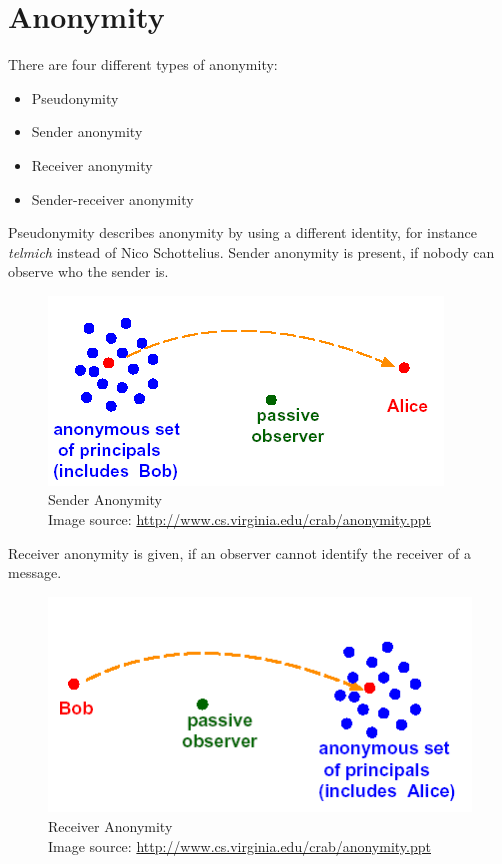 \section{Anonymity}
There are four different types of anonymity:
\begin{itemize}
\item Pseudonymity
\item Sender anonymity
\item Receiver anonymity
\item Sender-receiver anonymity
\end{itemize}
Pseudonymity describes anonymity by using a different identity, for instance
\textit{telmich} instead of Nico Schottelius.
Sender anonymity is present, if nobody can observe who the sender is.
\begin{figure}
    \centering
    \caption[Sender Anonymity]{Sender Anonymity\\Image source: \protect\url{http://www.cs.virginia.edu/crab/anonymity.ppt}}
    \label{senderanon}
    \includegraphics[scale=0.8]{sender-anon.png}
\end{figure}
Receiver anonymity is given, if an observer cannot identify  the receiver of
a message. 
\begin{figure}
    \centering
    \caption[Receiver Anonymity]{Receiver Anonymity\\Image source: \protect\url{http://www.cs.virginia.edu/crab/anonymity.ppt}}
    \label{receiveranon}
    \includegraphics[scale=0.8]{receiver-anon.png}
\end{figure}

